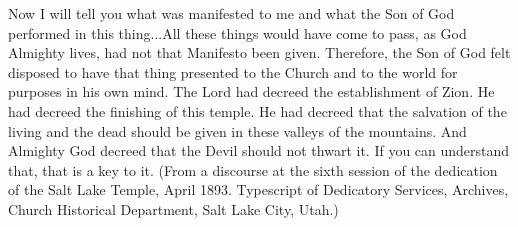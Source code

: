 		Now I will tell you what was manifested to me and what the Son of God performed in this thing...All these things would have come to pass, as God Almighty lives, had not that Manifesto been given.  Therefore, the Son of God felt disposed to have that thing presented to the Church and to the world for purposes in his own mind.  The Lord had decreed the establishment of Zion.  He had decreed the finishing of this temple.  He had decreed that the salvation of the living and the dead should be given in these valleys of the mountains.  And Almighty God decreed that the Devil should not thwart it.  If you can understand that, that is a key to it.  (From a discourse at the sixth session of the dedication of the Salt Lake Temple, April 1893.  Typescript of Dedicatory Services, Archives, Church Historical Department, Salt Lake City, Utah.)